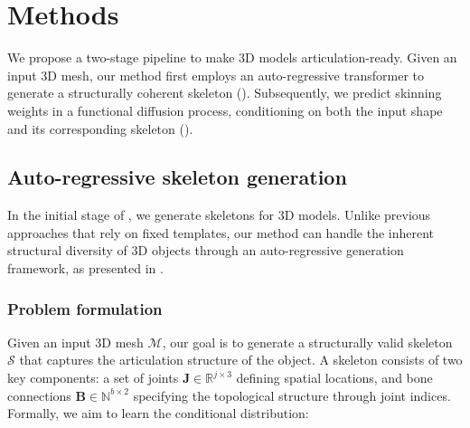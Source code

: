 \section{Methods}


We propose a two-stage pipeline to make 3D models articulation-ready. Given an input 3D mesh, our method first employs an auto-regressive transformer to generate a structurally coherent skeleton (). Subsequently, we predict skinning weights in a functional diffusion process, conditioning on both the input shape and its corresponding skeleton (). 

\subsection{Auto-regressive skeleton generation}
\label{ar}
In the initial stage of \ours{}, we generate skeletons for 3D models. Unlike previous approaches that rely on fixed templates, our method can handle the inherent structural diversity of 3D objects through an auto-regressive generation framework, as presented in .

\subsubsection{Problem formulation}
Given an input 3D mesh $\mathcal{M}$, our goal is to generate a structurally valid skeleton $\mathcal{S}$ that captures the articulation structure of the object. A skeleton consists of two key components: a set of joints $\mathbf{J} \in \mathbb{R}^{j \times 3}$ defining spatial locations, and bone connections $\mathbf{B} \in \mathbb{N}^{b \times 2}$ specifying the topological structure through joint indices. Formally, we aim to learn the conditional distribution:

